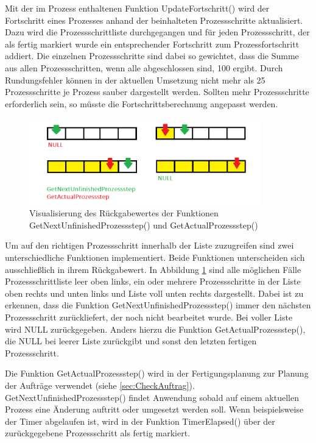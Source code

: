 Mit der im Prozess enthaltenen Funktion UpdateFortschritt() wird der Fortschritt eines Prozesses anhand der beinhalteten Prozessschritte aktualisiert. Dazu wird die Prozessschrittliste durchgegangen und für jeden Prozessschritt, der als fertig markiert wurde ein entsprechender Fortschritt zum Prozessfortschritt addiert. Die einzelnen Prozessschritte sind dabei so gewichtet, dass die Summe aus allen Prozessschritten, wenn alle abgeschlossen sind, 100 ergibt. Durch Rundungsfehler können in der aktuellen Umsetzung nicht mehr als 25 Prozessschritte je Prozess sauber dargestellt werden. Sollten mehr Prozessschritte erforderlich sein, so müsste die Fortschrittsberechnung angepasst werden.

\begin{figure}[htb]
    \centering
    \includegraphics[width=0.9\textwidth]{Abbildungen/GetProzessstep.PNG}
    \caption{Visualisierung des Rückgabewertes der Funktionen GetNextUnfinishedProzessstep() und GetActualProzessstep()}		
    \label{fig:GetProzessstepFunktionen}
\end{figure}

Um auf den richtigen Prozessschritt innerhalb der Liste zuzugreifen sind zwei unterschiedliche Funktionen implementiert. Beide Funktionen unterscheiden sich ausschließlich in ihrem Rückgabewert. In Abbildung \ref{fig:GetProzessstepFunktionen} sind alle möglichen Fälle Prozessschrittliste leer oben links, ein oder mehrere Prozessschritte in der Liste oben rechts und unten links und Liste voll unten rechts dargestellt. Dabei ist zu erkennen, dass die Funktion GetNextUnfinishedProzessstep() immer den nächsten Prozessschritt zurückliefert, der noch nicht bearbeitet wurde. Bei voller Liste wird NULL zurückgegeben. Anders hierzu die Funktion GetActualProzessstep(), die NULL bei leerer Liste zurückgibt und sonst den letzten fertigen Prozessschritt. 

Die Funktion GetActualProzessstep() wird in der Fertigungsplanung zur Planung der Aufträge verwendet (siehe \ref{sec:CheckAuftrag}). GetNextUnfinishedProzessstep() findet Anwendung sobald auf einem aktuellen Prozess eine Änderung auftritt oder umgesetzt werden soll. Wenn beispielsweise der Timer abgelaufen ist, wird in der Funktion TimerElapsed() über der zurückgegebene Prozessschritt als fertig markiert.

